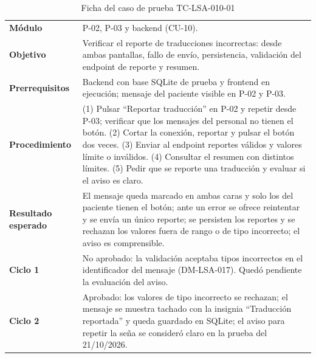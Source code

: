 \begin{table}[H]
  \centering
  \caption{Ficha del caso de prueba TC-LSA-010-01}\label{tab:ficha-010}
  \small
  \begin{tabularx}{\textwidth}{>{\raggedright\arraybackslash}p{3.3cm} X}
    \toprule
    \textbf{Módulo} & P-02, P-03 y backend (CU-10). \\
    \textbf{Objetivo} & Verificar el reporte de traducciones incorrectas: desde ambas pantallas, fallo de envío, persistencia, validación del endpoint de reporte y resumen. \\
    \textbf{Prerrequisitos} & Backend con base SQLite de prueba y frontend en ejecución; mensaje del paciente visible en P-02 y P-03. \\
    \textbf{Procedimiento} & (1) Pulsar ``Reportar traducción'' en P-02 y repetir desde P-03; verificar que los mensajes del personal no tienen el botón. (2) Cortar la conexión, reportar y pulsar el botón dos veces. (3) Enviar al endpoint reportes válidos y valores límite o inválidos. (4) Consultar el resumen con distintos límites. (5) Pedir que se reporte una traducción y evaluar si el aviso es claro. \\
    \textbf{Resultado esperado} & El mensaje queda marcado en ambas caras y solo los del paciente tienen el botón; ante un error se ofrece reintentar y se envía un único reporte; se persisten los reportes y se rechazan los valores fuera de rango o de tipo incorrecto; el aviso es comprensible. \\
    \textbf{Ciclo 1} & No aprobado: la validación aceptaba tipos incorrectos en el identificador del mensaje (DM-LSA-017). Quedó pendiente la evaluación del aviso. \\
    \textbf{Ciclo 2} & Aprobado: los valores de tipo incorrecto se rechazan; el mensaje se muestra tachado con la insignia ``Traducción reportada'' y queda guardado en SQLite; el aviso para repetir la seña se consideró claro en la prueba del 21/10/2026. \\
    \bottomrule
  \end{tabularx}
\end{table}

